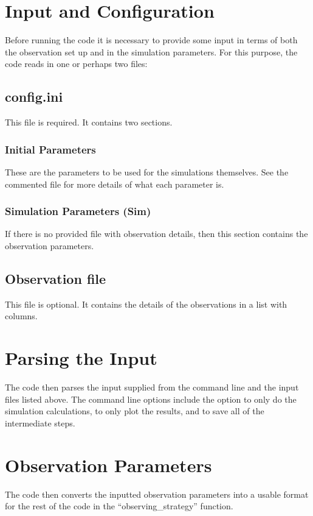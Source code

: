 \documentclass{article}
\author{\hwauthor}
\title{\hwtitle}
\date{\today}
\begin{document}
	
	\maketitle
	\thispagestyle{fancy}
	
	
\section{Input and Configuration}
Before running the code it is necessary to provide some input in terms of both the observation set up and in the simulation parameters. For this purpose, the code reads in one or perhaps two files:
\subsection{config.ini}
This file is required. It contains two sections.
\subsubsection{Initial Parameters}
These are the parameters to be used for the simulations themselves. See the commented file for more details of what each parameter is. 
\subsubsection{Simulation Parameters (Sim)}
If there is no provided file with observation details, then this section contains the observation parameters.
\subsection{Observation file}
This file is optional. It contains the details of the observations in a list with columns.

\section{Parsing the Input}
The code then parses the input supplied from the command line and the input files listed above. The command line options include the option to only do the simulation calculations, to only plot the results, and to save all of the intermediate steps.
\section{Observation Parameters}
 The code then converts the inputted observation parameters into a usable format for the rest of the code in the ``observing\_strategy'' function. 
\end{document}
